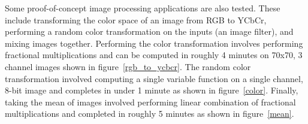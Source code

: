 \documentclass{article}
\begin{document}
        Some proof-of-concept image processing applications are also tested.
        These include transforming the color space of an image from RGB to YCbCr,
        performing a random color transformation on the inputs (an image filter), and mixing images together.
        Performing the color transformation involves performing fractional multiplications and can be computed in roughly 4 minutes on 70x70, 3 channel images shown in figure~\ref{rgb_to_ycbcr}.
        The random color transformation involved computing a single variable function
        on a single channel, 8-bit image and completes in under 1 minute as shown in figure~\ref{color}.
        Finally, taking the mean of images involved performing linear combination of fractional multiplications and completed in roughly 5 minutes as shown in figure~\ref{mean}.
\end{document}
